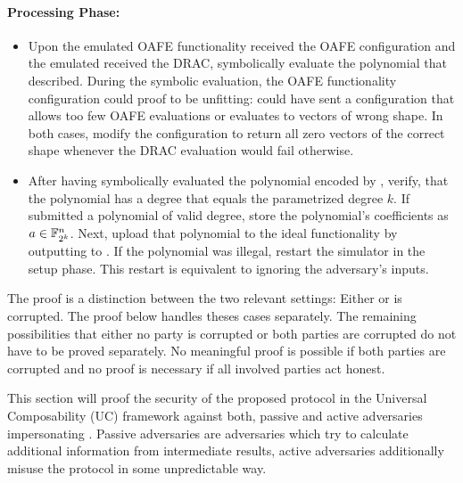 \paragraph{Processing Phase:}

\begin{itemize}

  \item Upon the emulated OAFE functionality received the OAFE configuration and
    the emulated \JWpTwo{} received the DRAC, symbolically evaluate the
    polynomial that \JWadv{} described. During the symbolic evaluation, the OAFE
    functionality configuration could proof to be unfitting: \JWadv{} could
    have sent a configuration that allows too few OAFE evaluations or evaluates
    to vectors of wrong shape. In both cases, modify the configuration to return
    all zero vectors of the correct shape whenever the DRAC evaluation would
    fail otherwise.

  \item After having symbolically evaluated the polynomial encoded by \JWadv{},
    verify, that the polynomial has a degree that equals the parametrized degree
    $k$. If \JWadv{} submitted a polynomial of valid degree, store the
    polynomial's coefficients as $a \in \mathbb{F}_{2^k}^n$.  Next, upload that
    polynomial to the ideal functionality \JWfuncSymOPEnp{} by outputting
     to \JWfuncSymOPEnp{}.  If the polynomial was illegal,
    restart the simulator in the setup phase.  This restart is equivalent to
    ignoring the adversary's inputs.

\end{itemize}


%
%
\label{sec:proof}

The proof is a distinction between the two relevant settings: Either \JWpOne{}
or \JWpTwo{} is corrupted. The proof below handles theses cases separately. The
remaining possibilities that either no party is corrupted or both parties are
corrupted do not have to be proved separately. No meaningful proof is possible
if both parties are corrupted and no proof is necessary if all involved parties
act honest.



This section will proof the security of the proposed protocol \JWprotoSymOPE
in the Universal Composability (UC) framework \cite{canetti05} against both,
passive and active adversaries impersonating \JWpTwo{}. Passive adversaries are
adversaries which try to calculate additional information from intermediate
results, active adversaries additionally misuse the protocol in some
unpredictable way.

